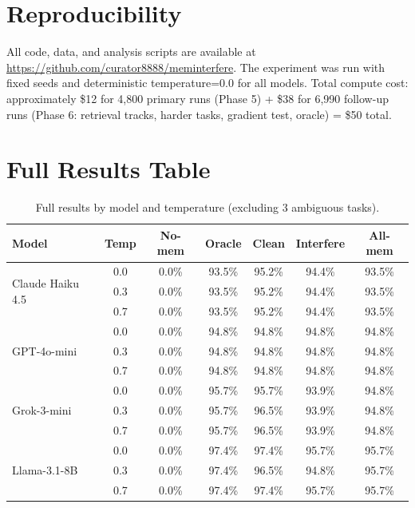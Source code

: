 \documentclass[11pt]{article}
\begin{document}
\section*{Reproducibility}

All code, data, and analysis scripts are available at \url{https://github.com/curator8888/meminterfere}. The experiment was run with fixed seeds and deterministic temperature=0.0 for all models. Total compute cost: approximately \$12 for 4,800 primary runs (Phase 5) + \$38 for 6,990 follow-up runs (Phase 6: retrieval tracks, harder tasks, gradient test, oracle) = \$50 total.



\appendix

\section{Full Results Table}

\begin{table}[t]
\centering
\small
\begin{tabular}{lcccccc}
\toprule
\textbf{Model} & \textbf{Temp} & \textbf{No-mem} & \textbf{Oracle} & \textbf{Clean} & \textbf{Interfere} & \textbf{All-mem} \\
\midrule
\multirow{3}{*}{Claude Haiku 4.5} & 0.0 & 0.0\% & 93.5\% & 95.2\% & 94.4\% & 93.5\% \\
 & 0.3 & 0.0\% & 93.5\% & 95.2\% & 94.4\% & 93.5\% \\
 & 0.7 & 0.0\% & 93.5\% & 95.2\% & 94.4\% & 93.5\% \\
\midrule
\multirow{3}{*}{GPT-4o-mini} & 0.0 & 0.0\% & 94.8\% & 94.8\% & 94.8\% & 94.8\% \\
 & 0.3 & 0.0\% & 94.8\% & 94.8\% & 94.8\% & 94.8\% \\
 & 0.7 & 0.0\% & 94.8\% & 94.8\% & 94.8\% & 94.8\% \\
\midrule
\multirow{3}{*}{Grok-3-mini} & 0.0 & 0.0\% & 95.7\% & 95.7\% & 93.9\% & 94.8\% \\
 & 0.3 & 0.0\% & 95.7\% & 96.5\% & 93.9\% & 94.8\% \\
 & 0.7 & 0.0\% & 95.7\% & 96.5\% & 93.9\% & 94.8\% \\
\midrule
\multirow{3}{*}{Llama-3.1-8B} & 0.0 & 0.0\% & 97.4\% & 97.4\% & 95.7\% & 95.7\% \\
 & 0.3 & 0.0\% & 97.4\% & 96.5\% & 94.8\% & 95.7\% \\
 & 0.7 & 0.0\% & 97.4\% & 97.4\% & 95.7\% & 95.7\% \\
\bottomrule
\end{tabular}
\caption{Full results by model and temperature (excluding 3 ambiguous tasks).}
\label{tab:full}
\end{table}
\end{document}
